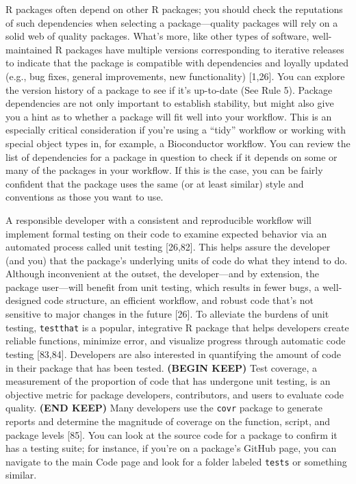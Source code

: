 \documentclass[10pt,letterpaper]{article}
\begin{document}
R packages often depend on other R packages; you should check the
reputations of such dependencies when selecting a package---quality
packages will rely on a solid web of quality packages. What's more, like
other types of software, well-maintained R packages have multiple
versions corresponding to iterative releases to indicate that the
package is compatible with dependencies and loyally updated (e.g., bug
fixes, general improvements, new functionality) {[}1,26{]}. You can
explore the version history of a package to see if it's up-to-date (See
Rule 5). Package dependencies are not only important to establish
stability, but might also give you a hint as to whether a package will
fit well into your workflow. This is an especially critical
consideration if you're using a ``tidy'' workflow or working with
special object types in, for example, a Bioconductor workflow. You can
review the list of dependencies for a package in question to check if it
depends on some or many of the packages in your workflow. If this is the
case, you can be fairly confident that the package uses the same (or at
least similar) style and conventions as those you want to use.

A responsible developer with a consistent and reproducible workflow will
implement formal testing on their code to examine expected behavior via
an automated process called unit testing {[}26,82{]}. This helps assure
the developer (and you) that the package's underlying units of code do
what they intend to do. Although inconvenient at the outset, the
developer---and by extension, the package user---will benefit from unit
testing, which results in fewer bugs, a well-designed code structure, an
efficient workflow, and robust code that's not sensitive to major
changes in the future {[}26{]}. To alleviate the burdens of unit
testing, \texttt{testthat} is a popular, integrative R package that
helps developers create reliable functions, minimize error, and
visualize progress through automatic code testing {[}83,84{]}.
Developers are also interested in quantifying the amount of code in
their package that has been tested. \textbf{(BEGIN KEEP)} Test coverage,
a measurement of the proportion of code that has undergone unit testing,
is an objective metric for package developers, contributors, and users
to evaluate code quality. \textbf{(END KEEP)} Many developers use the
\texttt{covr} package to generate reports and determine the magnitude of
coverage on the function, script, and package levels {[}85{]}. You can
look at the source code for a package to confirm it has a testing suite;
for instance, if you're on a package's GitHub page, you can navigate to
the main Code page and look for a folder labeled \texttt{tests} or
something similar.
\end{document}

